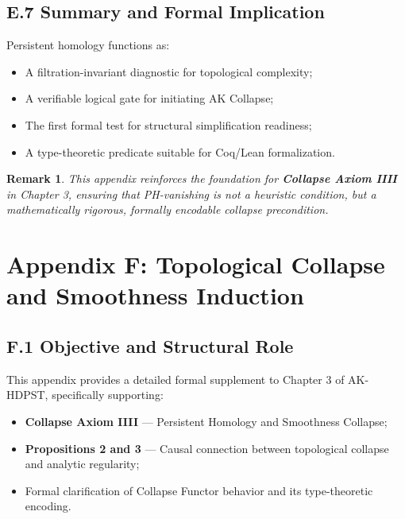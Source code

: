 \documentclass[11pt]{article}
\newtheorem{remark}[theorem]{Remark}
\begin{document}
\subsection*{E.7 Summary and Formal Implication}

Persistent homology functions as:

\begin{itemize}
    \item A filtration-invariant diagnostic for topological complexity;
    \item A verifiable logical gate for initiating AK Collapse;
    \item The first formal test for structural simplification readiness;
    \item A type-theoretic predicate suitable for Coq/Lean formalization.
\end{itemize}

\begin{remark}
This appendix reinforces the foundation for \textbf{Collapse Axiom IIII} in Chapter 3, ensuring that PH-vanishing is not a heuristic condition, but a mathematically rigorous, formally encodable collapse precondition.
\end{remark}



\section*{Appendix F: Topological Collapse and Smoothness Induction}

\subsection*{F.1 Objective and Structural Role}

This appendix provides a detailed formal supplement to Chapter 3 of AK-HDPST, specifically supporting:

\begin{itemize}
    \item \textbf{Collapse Axiom IIII} — Persistent Homology and Smoothness Collapse;
    \item \textbf{Propositions 2 and 3} — Causal connection between topological collapse and analytic regularity;
    \item Formal clarification of Collapse Functor behavior and its type-theoretic encoding.
\end{itemize}
\end{document}
